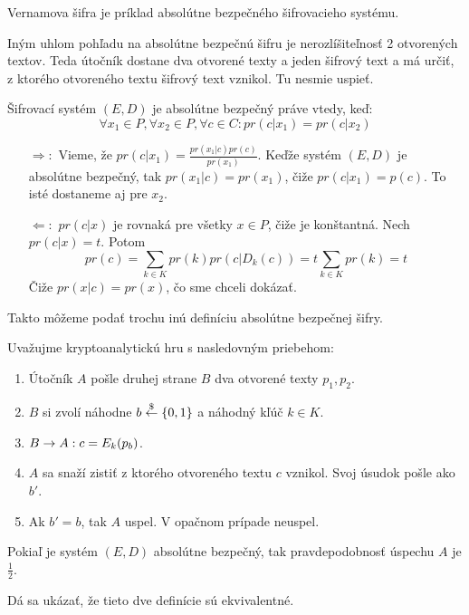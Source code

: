 \begin{priklad}
    Vernamova šifra je príklad absolútne bezpečného šifrovacieho systému.
\end{priklad}

Iným uhlom pohľadu na absolútne bezpečnú šifru je nerozlíšiteľnosť 2 otvorených textov. 
Teda útočník dostane dva otvorené texty a jeden šifrový text a má určiť, z ktorého otvoreného
textu šifrový text vznikol. Tu nesmie uspieť.

\begin{veta}
    Šifrovací systém $(E,D)$ je absolútne bezpečný práve vtedy, keď:
    \begin{equation*}
        \forall x_1 \in P, \forall x_2 \in P, \forall c \in C
            \colon pr(c|x_1)=pr(c|x_2)
    \end{equation*}
\end{veta}

\begin{dokaz}
    \noindent
    \begin{itemize}
    \item[$\Rightarrow:$] 
        Vieme, že $pr(c|x_1) = \frac{pr(x_1|c) pr(c)}{pr(x_1)}$. 
        Keďže systém $(E,D)$ je absolútne bezpečný, 
        tak $pr(x_1|c) = pr(x_1)$, čiže $pr(c|x_1) = p(c)$. 
        To isté dostaneme aj pre $x_2$.

    \item[$\Leftarrow:$]
        $pr(c|x)$ je rovnaká pre všetky $x \in P$, čiže je konštantná. 
        Nech $pr(c|x) = t$. Potom
        \begin{equation*}
            pr(c) = \sum_{k \in K} pr(k) pr(c|D_k(c)) = 
                t \sum_{k \in K} pr(k) = t
        \end{equation*}
        Čiže $pr(x|c) = pr(x)$, čo sme chceli dokázať.
    \end{itemize}
\end{dokaz}

Takto môžeme podať trochu inú definíciu absolútne bezpečnej šifry.

\begin{definicia}
    Uvažujme kryptoanalytickú hru s nasledovným priebehom:
    \begin{enumerate}
        \item Útočník $A$ pošle druhej strane $B$ dva otvorené texty $p_1, p_2$.
        \item $B$ si zvolí náhodne $b \overset{\$}{\leftarrow} \{0,1\}$
            a náhodný kľúč $k \in K$.
        \item $B\rightarrow A: c = E_k(p_b)$.
        \item $A$ sa snaží zistiť z ktorého otvoreného textu $c$ vznikol. 
            Svoj úsudok pošle ako $b'$.
        \item Ak $b' = b$, tak $A$ uspel. V opačnom prípade neuspel.
    \end{enumerate}
    Pokiaľ je systém $(E,D)$ absolútne bezpečný, 
    tak pravdepodobnosť úspechu $A$ je $\frac{1}{2}$.
\end{definicia}

Dá sa ukázať, že tieto dve definície sú ekvivalentné.
